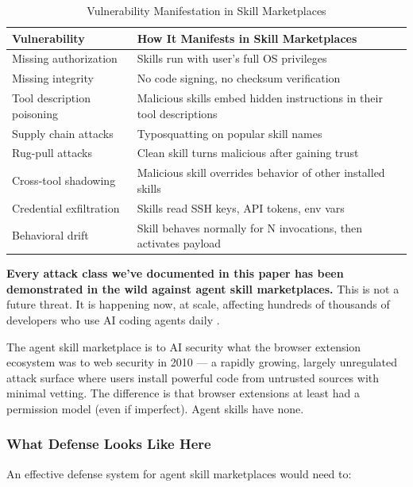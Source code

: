 \documentclass[11pt,letterpaper]{article}
\begin{document}
\begin{table}[htbp]
\centering
\caption{Vulnerability Manifestation in Skill Marketplaces}
\label{tab:skillvuln}
\begin{tabularx}{\textwidth}{lX}
\toprule
\textbf{Vulnerability} & \textbf{How It Manifests in Skill Marketplaces} \\
\midrule
Missing authorization & Skills run with user's full OS privileges \\
Missing integrity & No code signing, no checksum verification \\
Tool description poisoning & Malicious skills embed hidden instructions in their tool descriptions \cite{invariant} \\
Supply chain attacks & Typosquatting on popular skill names \cite{sandworm} \\
Rug-pull attacks & Clean skill turns malicious after gaining trust \cite{postmark} \\
Cross-tool shadowing & Malicious skill overrides behavior of other installed skills \\
Credential exfiltration & Skills read SSH keys, API tokens, env vars \cite{sandworm} \\
Behavioral drift & Skill behaves normally for N invocations, then activates payload \\
\bottomrule
\end{tabularx}
\end{table}

\textbf{Every attack class we've documented in this paper has been demonstrated in the wild against agent skill marketplaces.} This is not a future threat. It is happening now, at scale, affecting hundreds of thousands of developers who use AI coding agents daily \cite{antiy,sandworm,postmark}.

The agent skill marketplace is to AI security what the browser extension ecosystem was to web security in 2010 --- a rapidly growing, largely unregulated attack surface where users install powerful code from untrusted sources with minimal vetting. The difference is that browser extensions at least had a permission model (even if imperfect). Agent skills have none.


\subsubsection{What Defense Looks Like Here}

An effective defense system for agent skill marketplaces would need to:
\end{document}
